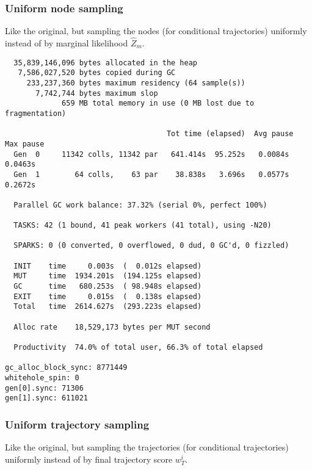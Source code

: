 \subsubsection{Uniform node sampling}
\label{sub:ipmcmc_uniform_node_sampling}

Like the original, but sampling the nodes (for conditional trajectories) uniformly instead of by marginal likelihood $\hat Z_m$.

{\small
\begin{verbatim}
  35,839,146,096 bytes allocated in the heap
   7,586,027,520 bytes copied during GC
     233,237,360 bytes maximum residency (64 sample(s))
       7,742,744 bytes maximum slop
             659 MB total memory in use (0 MB lost due to fragmentation)

                                     Tot time (elapsed)  Avg pause  Max pause
  Gen  0     11342 colls, 11342 par   641.414s  95.252s   0.0084s    0.0463s
  Gen  1        64 colls,    63 par    38.838s   3.696s   0.0577s    0.2672s

  Parallel GC work balance: 37.32% (serial 0%, perfect 100%)

  TASKS: 42 (1 bound, 41 peak workers (41 total), using -N20)

  SPARKS: 0 (0 converted, 0 overflowed, 0 dud, 0 GC'd, 0 fizzled)

  INIT    time     0.003s  (  0.012s elapsed)
  MUT     time  1934.201s  (194.125s elapsed)
  GC      time   680.253s  ( 98.948s elapsed)
  EXIT    time     0.015s  (  0.138s elapsed)
  Total   time  2614.627s  (293.223s elapsed)

  Alloc rate    18,529,173 bytes per MUT second

  Productivity  74.0% of total user, 66.3% of total elapsed

gc_alloc_block_sync: 8771449
whitehole_spin: 0
gen[0].sync: 71306
gen[1].sync: 611021
\end{verbatim}
}

\subsubsection{Uniform trajectory sampling}
\label{ssub:uniform_trajectory_sampling}

Like the original, but sampling the trajectories (for conditional trajectories) uniformly instead of by final trajectory score $w_T^i$.

